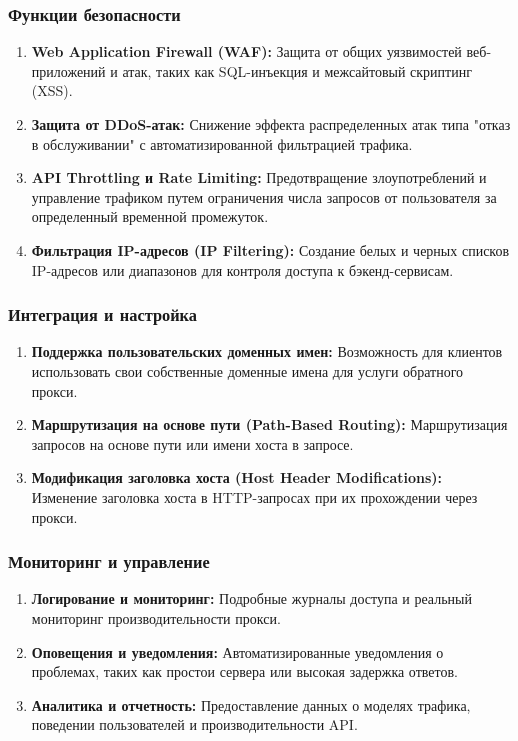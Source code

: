 \documentclass[14pt, a4paper]{extarticle}
\begin{document}
\subsubsection*{Функции безопасности}

\begin{enumerate}
\item \textbf{Web Application Firewall (WAF):} Защита от общих уязвимостей веб-приложений и атак, таких как SQL-инъекция и межсайтовый скриптинг (XSS).
\item \textbf{Защита от DDoS-атак:} Снижение эффекта распределенных атак типа "отказ в обслуживании" с автоматизированной фильтрацией трафика.
\item \textbf{API Throttling и Rate Limiting:} Предотвращение злоупотреблений и управление трафиком путем ограничения числа запросов от пользователя за определенный временной промежуток.
\item \textbf{Фильтрация IP-адресов (IP Filtering):} Создание белых и черных списков IP-адресов или диапазонов для контроля доступа к бэкенд-сервисам.
\end{enumerate}

\subsubsection*{Интеграция и настройка}

\begin{enumerate}
\item \textbf{Поддержка пользовательских доменных имен:} Возможность для клиентов использовать свои собственные доменные имена для услуги обратного прокси.
\item \textbf{Маршрутизация на основе пути (Path-Based Routing):} Маршрутизация запросов на основе пути или имени хоста в запросе.
\item \textbf{Модификация заголовка хоста (Host Header Modifications):} Изменение заголовка хоста в HTTP-запросах при их прохождении через прокси.
\end{enumerate}

\subsubsection*{Мониторинг и управление}

\begin{enumerate}
\item \textbf{Логирование и мониторинг:} Подробные журналы доступа и реальный мониторинг производительности прокси.
\item \textbf{Оповещения и уведомления:} Автоматизированные уведомления о проблемах, таких как простои сервера или высокая задержка ответов.
\item \textbf{Аналитика и отчетность:} Предоставление данных о моделях трафика, поведении пользователей и производительности API.
\end{enumerate}
\end{document}
